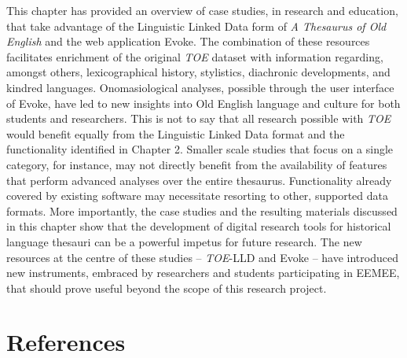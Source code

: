 This chapter has provided an overview of case studies, in research and education, that take advantage of the Linguistic Linked Data form of \textit{A Thesaurus of Old English} and the web application Evoke. The combination of these resources %
facilitates enrichment of the original \textit{TOE} dataset with information regarding, amongst others, lexicographical history, stylistics, diachronic developments, and kindred languages. Onomasiological analyses, possible through the user interface of Evoke, have led to new insights into Old English language and culture for both students and researchers. 
This is not to say that all research possible with \textit{TOE} would benefit equally from the Linguistic Linked Data format and the functionality identified in Chapter 2. Smaller scale studies that focus on a single category, for instance, may not directly benefit from the availability of features that perform advanced analyses over the entire thesaurus. Functionality already covered by existing software may necessitate resorting to other, supported data formats. 
More importantly, the case studies and the resulting materials discussed in this chapter show that the development of digital research tools for historical language thesauri can be a powerful impetus for future research. 
The new resources at the centre of these studies -- \textit{TOE}-LLD and Evoke -- have introduced new instruments, embraced by researchers and students participating in EEMEE, that should prove useful beyond the scope of this research project.




\section*{References}

